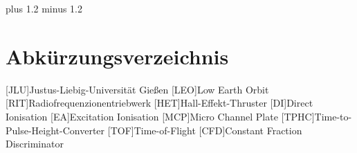 \documentclass[fontsize=11pt,%
twoside,
BCOR          = 8mm]{scrreprt}
\author{Lorenz Saalmann}
\begin{document}
\noindent

\font plus 1.2\font
minus 1.2\font






\cleardoublepage

\tableofcontents
\cleardoublepage

\listoffigures
\listoftables
\chapter*{Abk\"{u}rzungsverzeichnis}
\begin{acronym}
[JLU]{\dotfill Justus-Liebig-Universit\"{a}t Gie{\ss}en}
[LEO]{\dotfill Low Earth Orbit}
[RIT]{\dotfill Radiofrequenzionentriebwerk}
[HET]{\dotfill Hall-Effekt-Thruster}
[DI]{\dotfill Direct Ionisation}
[EA]{\dotfill Excitation Ionisation}
[MCP]{\dotfill Micro Channel Plate}
[TPHC]{\dotfill Time-to-Pulse-Height-Converter}
[TOF]{\dotfill Time-of-Flight}
[CFD]{\dotfill Constant Fraction Discriminator}

\end{acronym}
\cleardoublepage

\onehalfspacing

\cleardoublepage


\cleardoublepage

\cleardoublepage

\cleardoublepage

\cleardoublepage

\cleardoublepage


\fontsize{12pt}{12pt}\selectfont

\renewcommand\bibname{Literaturverzeichnis}
\clearpage
{}
{}

\printbibliography
\end{document}
